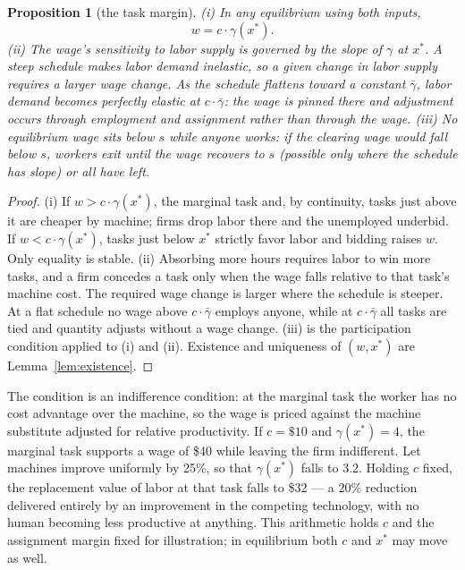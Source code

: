 \documentclass[12pt]{article}
\theoremstyle{plain}
\newtheorem{proposition}{Proposition}
\begin{document}
\begin{proposition}[the task margin]\label{prop:margin}
(i) In any equilibrium using both inputs,
\[
w = c\cdot\gamma(x^*).
\]
(ii) The wage's sensitivity to labor supply is governed by the slope of $\gamma$
at $x^*$. A steep schedule makes labor demand inelastic, so a given change in
labor supply requires a larger wage change. As the schedule flattens toward a
constant $\bar{\gamma}$, labor demand becomes perfectly elastic at
$c\cdot\bar{\gamma}$: the wage is pinned there and adjustment occurs through
employment and assignment rather than through the wage.
(iii) No equilibrium wage sits below $s$ while anyone works: if the clearing wage
would fall below $s$, workers exit until the wage recovers to $s$ (possible only
where the schedule has slope) or all have left.
\end{proposition}

\begin{proof}
(i) If $w > c\cdot\gamma(x^*)$, the marginal task and, by continuity, tasks just
above it are cheaper by machine; firms drop labor there and the unemployed
underbid. If $w < c\cdot\gamma(x^*)$, tasks just below $x^*$ strictly favor labor
and bidding raises $w$. Only equality is stable.
(ii) Absorbing more hours requires labor to win more tasks, and a firm concedes a
task only when the wage falls relative to that task's machine cost. The required
wage change is larger where the schedule is steeper. At a flat schedule no wage
above $c\cdot\bar{\gamma}$ employs anyone, while at
$c\cdot\bar{\gamma}$ all tasks are tied and quantity adjusts without a wage
change.
(iii) is the participation condition applied to (i) and (ii). Existence and
uniqueness of $(w,x^*)$ are Lemma~\ref{lem:existence}.
\end{proof}

The condition is an indifference condition: at the marginal task the worker has
no cost advantage over the machine, so the wage is priced against the machine
substitute adjusted for relative productivity. If $c=\$10$ and
$\gamma(x^*)=4$, the marginal task supports a wage of \$40 while leaving the firm
indifferent. Let machines improve uniformly by 25\%, so that $\gamma(x^*)$ falls
to 3.2. Holding $c$ fixed, the replacement value of labor at that task falls to
\$32 --- a 20\% reduction delivered entirely by an improvement in the competing
technology, with no human becoming less productive at anything. This arithmetic
holds $c$ and the assignment margin fixed for illustration; in equilibrium both
$c$ and $x^*$ may move as well.
\end{document}
